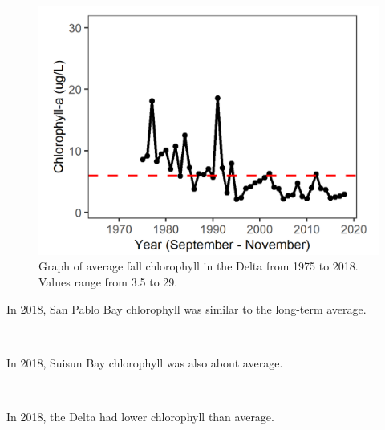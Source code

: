 \documentclass[
]{book}
\begin{document}
\begin{panel-grid}
\begin{columns-nocenter}
\begin{column800}
\begin{expand}
\begin{figure}
\includegraphics[width=15.25in]{figures/chla_dtfall} \caption{Graph of average fall chlorophyll in the Delta from 1975 to 2018. Values range from 3.5 to 29.}\label{fig:unnamed-chunk-110}
\end{figure}

\end{expand}

\end{column800}

\end{columns-nocenter}

\begin{columns-nocenter}

\begin{column800}

In 2018, San Pablo Bay chlorophyll was similar to the long-term average.

\end{column800}

\begin{column40}

~

\end{column40}

\begin{column800}

In 2018, Suisun Bay chlorophyll was also about average.

\end{column800}

\begin{column40}

~

\end{column40}

\begin{column800}

In 2018, the Delta had lower chlorophyll than average.

\end{column800}

\end{columns-nocenter}

\end{panel-grid}
\end{document}
